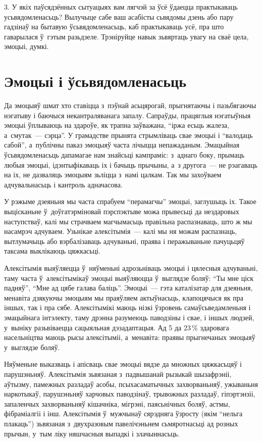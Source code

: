 3. У якіх паўсядзённых сытуацыях вам лягчэй за ўсё ўдаецца практыкаваць усьвядомленасьць? Вылучыце сабе ваш асабісты сьвядомы дзень або пару гадзінаў на бытавую ўсьвядомленасьць, каб практыкаваць усё, пра што гаварылася ў~гэтым разьдзеле. Трэніруйце навык зьвяртаць увагу на сваё цела, эмоцыі, думкі.


\section{Эмоцыі і ўсьвядомленасьць}

Да эмоцыяў шмат хто ставіцца з~пэўнай асьцярогай, прыгнятаючы і пазьбягаючы нэгатыву і баючыся некантраляванага запалу. Сапраўды, працяглыя нэгатыўныя эмоцыі ўплываюць на здароўе, як трапна заўважана, ``іржа есьць жалеза, а~смутак~--- сэрца''. У грамадстве прынята стрымліваць свае эмоцыі і ``валодаць сабой'', а~публічны паказ эмоцыяў часта лічыцца непажаданым. Эмацыйная ўсьвядомленасьць дапамагае нам знайсьці кампраміс: з~аднаго боку, прымаць любыя эмоцыі, ідэнтыфікаваць іх і бачыць прычыны, а~з другога~--- не рэагаваць на іх, не дазваляць эмоцыям зьліцца з~намі цалкам. Так мы захоўваем адчувальнасьць і кантроль адначасова.

У рэжыме дзеяньня мы часта спрабуем ``перамагчы'' эмоцыі, заглушыць іх. Такое выцісканьне ў~доўгатэрміновай пэрспэктыве можа прывесьці да нездаровых наступстваў, калі мы страчваем магчымасьць правільна распазнаваць, што ж мы насамрэч адчуваем. Узьнікае алексітымія~--- калі мы ня можам распазнаць, вытлумачыць або вэрбалізаваць адчуваньні, праява і перажываньне пачуцьцяў таксама выклікаюць цяжкасьці.

Алексітымія выяўляецца ў~няўменьні адрозьніваць эмоцыі і цялесныя адчуваньні, таму часта ў~алексітымікаў эмоцыі выяўляюцца ў~выглядзе боляў: ``Ты мне ціск падняў'', ``Мне ад цябе галава баліць''. Эмоцыі~--- гэта каталізатар для дзеяньня, менавіта дзякуючы эмоцыям мы праяўляем актыўнасьць, клапоцячыся як пра іншых, так і пра сябе. Алексітымікі маюць нізкі ўзровень самаўсьведамленьня і эмацыйнага інтэлекту, таму дрэнна разумеюць паводзіны і свае, і іншых людзей, у~выніку разьвіваецца сацыяльная дэзадаптацыя. Ад 5 да 23\,\% здаровага насельніцтва маюць рысы алексітыміі, а~менавіта: праявы прыгнечаных эмоцыяў у~выглядзе боляў.

Няўменьне выказваць і апісваць свае эмоцыі вядзе да множных цяжкасьцяў і парушэньняў. Алексітымія зьвязаная з~падвышанай рызыкай шызафрэніі, аўтызму, памежных разладаў асобы, псыхасаматычных захворваньняў, ужываньня наркотыкаў, парушэньняў харчовых паводзінаў, трывожных разладаў, гіпэртэнзіі, запаленчых захворваньняў кішачніка, мігрэні, паясьнічных боляў, астмы, фібраміалгіі і інш. Алексітымія ў~мужчынаў сярэдняга ўзросту (якім ``нельга плакаць'') зьвязаная з~двухразовым павелічэньнем сьмяротнасьці ад розных прычын, у~тым ліку няшчасныя выпадкі і злачыннасьць.

